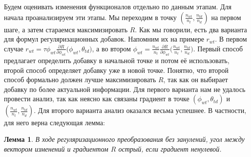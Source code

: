 \documentclass[12pt]{article}
\newtheorem{lemma}[remark]{Лемма}
\begin{document}
Будем оценивать изменения функционалов отдельно по данным этапам. Для начала проанализируем эти этапы. Мы переходим в точку $(\frac{n_{wt}}{n_t}, \frac{n_{td}}{n_d})$ на первом шаге, а затем стараемся максимизировать $R$. Как мы говорили, есть два варианта для формул регуляризационных добавок. Напомним их на примере $r_{wt}$. В первом случае $r_{wt} = \tau\phi_{wt} \frac{\partial{R}}{\partial{\phi_{wt}}} \big( \phi_{wt}, \theta_{td}\big)$, а во втором $\phi_{wt} = \frac{n_{wt}}{n_t} \frac{\partial{R}}{\partial{\phi_{wt}}} \big(\frac{n_{wt}}{n_t}, \frac{n_{td}}{n_d}\big)$. Первый способ предлагает определить добавку в начальной точке и потом её использовать, второй способ определяет добавку уже в новой точке. Понятно, что второй способ формально должен лучше максимизировать $R$, так как он выбирает добавку по более актуальной информации. Для первого варианта нам не удалось провести анализ, так как неясно как связаны градиент в точке $(\phi_{wt}, \theta_{td})$ и $(\frac{n_{wt}}{n_t}, \frac{n_{td}}{n_d})$. Для второго варианта анализ оказался весьма успешнее. В частности, для него верна следующая лемма:
\begin{lemma}           
 В ходе регуляризационного преобразования  без занулений, угол  между вектором изменений и градиентом $R$ острый, если градиент ненулевой.
\end{lemma}
\end{document}
